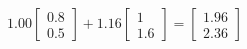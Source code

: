 \documentclass[preview]{standalone}
\begin{document}
\begin{align*}
1.00 \begin{bmatrix} 0.8 \\ 0.5 \end{bmatrix} + 1.16 \begin{bmatrix} 1 \\ 1.6 \end{bmatrix} = \begin{bmatrix} 1.96 \\ 2.36 \end{bmatrix}
\end{align*}
\end{document}

